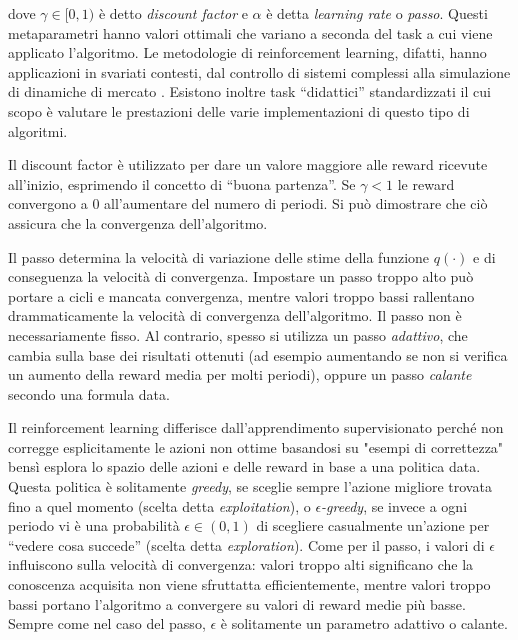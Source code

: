 \documentclass{article}
\begin{document}
dove $\gamma \in [0, 1)$ è detto \emph{discount factor} e $\alpha$ è detta \emph{learning rate} o \emph{passo}.
Questi metaparametri hanno valori ottimali che variano a seconda del task a cui viene applicato l'algoritmo. 
Le metodologie di reinforcement learning, difatti, hanno applicazioni in svariati contesti, dal controllo di sistemi complessi \citep{hu_voronoi-based_2020} alla simulazione di dinamiche di mercato \citep{calvano_artificial_2020}.
Esistono inoltre task ``didattici'' standardizzati il cui scopo è valutare le prestazioni delle varie implementazioni di questo tipo di algoritmi.

Il discount factor è utilizzato per dare un valore maggiore alle reward ricevute all'inizio, esprimendo il concetto di ``buona partenza''. 
Se $\gamma < 1$ le reward convergono a 0 all'aumentare del numero di periodi.
Si può dimostrare che ciò assicura che la convergenza dell'algoritmo. 

Il passo determina la velocità di variazione delle stime della funzione $q(\cdot)$ e di conseguenza la velocità di convergenza. 
Impostare un passo troppo alto può portare a cicli e mancata convergenza, mentre  valori troppo bassi rallentano drammaticamente la velocità di convergenza dell'algoritmo. 
Il passo non è necessariamente fisso. 
Al contrario, spesso si utilizza un passo \emph{adattivo}, che cambia sulla base dei risultati ottenuti (ad esempio aumentando se non si verifica un aumento della reward media per molti periodi), oppure un passo \emph{calante} secondo una formula data. 

Il reinforcement learning differisce dall'apprendimento supervisionato perché non corregge esplicitamente le azioni non ottime basandosi su "esempi di correttezza" bensì esplora lo spazio delle azioni e delle reward in base a una politica data. 
Questa politica è solitamente \emph{greedy}, se sceglie sempre l'azione migliore trovata fino a quel momento (scelta detta \emph{exploitation}),  o \emph{$\epsilon$-greedy}, se invece a ogni periodo vi è una probabilità $\epsilon \in (0, 1)$ di scegliere casualmente un'azione per ``vedere cosa succede'' (scelta detta \emph{exploration}). 
Come per il passo, i valori di $\epsilon$ influiscono sulla velocità di convergenza: valori troppo alti significano che la conoscenza acquisita non viene sfruttatta efficientemente, mentre valori troppo bassi portano l'algoritmo a convergere su valori di reward medie più basse.
Sempre come nel caso del passo, $\epsilon$ è solitamente un parametro adattivo o calante. 
\end{document}
